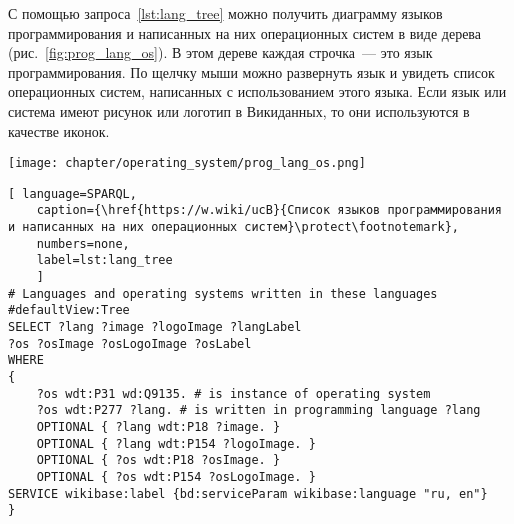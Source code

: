 С помощью запроса~\ref{lst:lang_tree} можно получить диаграмму языков программирования 
и написанных на них операционных систем в виде дерева (рис.~\ref{fig:prog_lang_os}). 
В этом дереве каждая строчка~--- это язык программирования. 
По щелчку мыши можно развернуть язык и увидеть список операционных систем, 
написанных с использованием этого языка. 
Если язык или система имеют рисунок или логотип в Викиданных, 
то они используются в качестве иконок.
%
\begin{marginfigure}[-4\baselineskip]
    \texttt{[image: chapter/operating\_system/prog\_lang\_os.png]}
    \caption[Дерево языков программирования и написанных на них ОС.]{Дерево языков программирования и написанных на них операционных систем}
	\label{fig:prog_lang_os}%
\end{marginfigure}
%
%


\begin{lstlisting}[ language=SPARQL, 
	caption={\href{https://w.wiki/ucB}{Список языков программирования и написанных на них операционных систем}\protect\footnotemark},
    numbers=none,
	label=lst:lang_tree
	]
# Languages and operating systems written in these languages
#defaultView:Tree
SELECT ?lang ?image ?logoImage ?langLabel 
?os ?osImage ?osLogoImage ?osLabel 
WHERE 
{
	?os wdt:P31 wd:Q9135. # is instance of operating system
	?os wdt:P277 ?lang. # is written in programming language ?lang
	OPTIONAL { ?lang wdt:P18 ?image. }
	OPTIONAL { ?lang wdt:P154 ?logoImage. }
	OPTIONAL { ?os wdt:P18 ?osImage. }
	OPTIONAL { ?os wdt:P154 ?osLogoImage. }
SERVICE wikibase:label {bd:serviceParam wikibase:language "ru, en"}
}
\end{lstlisting}
%









